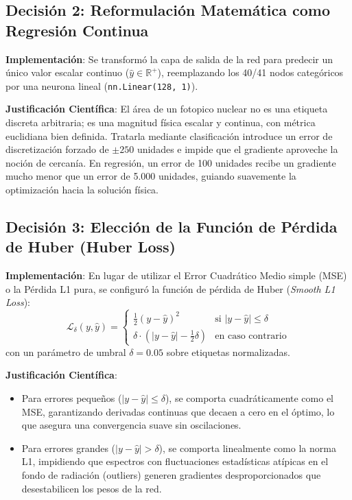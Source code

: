 \documentclass[11pt,a4paper]{article}
\begin{document}
\subsection{Decisión 2: Reformulación Matemática como Regresión Continua}
\textbf{Implementación}: Se transformó la capa de salida de la red para predecir un único valor escalar continuo ($\hat{y} \in \mathbb{R}^+$), reemplazando los 40/41 nodos categóricos por una neurona lineal (\texttt{nn.Linear(128, 1)}).

\textbf{Justificación Científica}: El área de un fotopico nuclear no es una etiqueta discreta arbitraria; es una magnitud física escalar y continua, con métrica euclidiana bien definida. Tratarla mediante clasificación introduce un error de discretización forzado de $\pm 250$ unidades e impide que el gradiente aproveche la noción de cercanía. En regresión, un error de 100 unidades recibe un gradiente mucho menor que un error de 5.000 unidades, guiando suavemente la optimización hacia la solución física.

\subsection{Decisión 3: Elección de la Función de Pérdida de Huber (Huber Loss)}
\textbf{Implementación}: En lugar de utilizar el Error Cuadrático Medio simple (MSE) o la Pérdida L1 pura, se configuró la función de pérdida de Huber (\textit{Smooth L1 Loss}):
\begin{equation}
\mathcal{L}_\delta(y, \hat{y}) = \begin{cases} 
\frac{1}{2} (y - \hat{y})^2 & \text{si } |y - \hat{y}| \le \delta \\[0.2cm]
\delta \cdot \left( |y - \hat{y}| - \frac{1}{2}\delta \right) & \text{en caso contrario}
\end{cases}
\end{equation}
con un parámetro de umbral $\delta = 0.05$ sobre etiquetas normalizadas.

\textbf{Justificación Científica}:
\begin{itemize}
    \item Para errores pequeños ($|y - \hat{y}| \le \delta$), se comporta cuadráticamente como el MSE, garantizando derivadas continuas que decaen a cero en el óptimo, lo que asegura una convergencia suave sin oscilaciones.
    \item Para errores grandes ($|y - \hat{y}| > \delta$), se comporta linealmente como la norma L1, impidiendo que espectros con fluctuaciones estadísticas atípicas en el fondo de radiación (outliers) generen gradientes desproporcionados que desestabilicen los pesos de la red.
\end{itemize}
\end{document}
